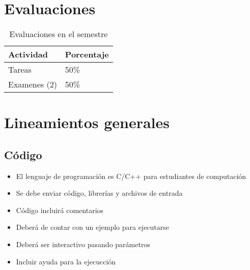 \section*{Evaluaciones}

\begin{table}[H]
	\centering
	\begin{tabular}{ll}\hline
		Actividad    & Porcentaje \\ \hline
		Tareas       & 50\%       \\
		Examenes (2) & 50\%       \\ \hline
	\end{tabular}
	\caption{Evaluaciones en el semestre}
\end{table}

\section*{Lineamientos generales}
\subsection*{Código}
\begin{itemize}
	\item El lenguaje de programación es C/C++ para estudiantes de computación
	\item Se debe enviar código, librerías y archivos de entrada
	\item Código incluirá comentarios
	\item Deberá de contar con un ejemplo para ejecutarse
	\item Deberá ser interactivo pasando parámetros
	\item Incluir ayuda para la ejecucción
\end{itemize}
